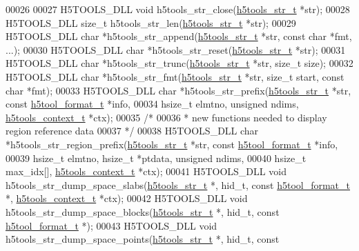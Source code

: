 \begin{DoxyCode}
00026 
00027 H5TOOLS\_DLL \textcolor{keywordtype}{void}     h5tools\_str\_close(\hyperlink{structh5tools__str__t}{h5tools\_str\_t} *str);
00028 H5TOOLS\_DLL \textcolor{keywordtype}{size\_t}   h5tools\_str\_len(\hyperlink{structh5tools__str__t}{h5tools\_str\_t} *str);
00029 H5TOOLS\_DLL \textcolor{keywordtype}{char}    *h5tools\_str\_append(\hyperlink{structh5tools__str__t}{h5tools\_str\_t} *str, \textcolor{keyword}{const} \textcolor{keywordtype}{char} *fmt, ...);
00030 H5TOOLS\_DLL \textcolor{keywordtype}{char}    *h5tools\_str\_reset(\hyperlink{structh5tools__str__t}{h5tools\_str\_t} *str);
00031 H5TOOLS\_DLL \textcolor{keywordtype}{char}    *h5tools\_str\_trunc(\hyperlink{structh5tools__str__t}{h5tools\_str\_t} *str, \textcolor{keywordtype}{size\_t} size);
00032 H5TOOLS\_DLL \textcolor{keywordtype}{char}    *h5tools\_str\_fmt(\hyperlink{structh5tools__str__t}{h5tools\_str\_t} *str, \textcolor{keywordtype}{size\_t} start, \textcolor{keyword}{const} \textcolor{keywordtype}{char} *fmt);
00033 H5TOOLS\_DLL \textcolor{keywordtype}{char}    *h5tools\_str\_prefix(\hyperlink{structh5tools__str__t}{h5tools\_str\_t} *str, \textcolor{keyword}{const} 
      \hyperlink{structh5tool__format__t}{h5tool\_format\_t} *info,
00034                         hsize\_t elmtno, \textcolor{keywordtype}{unsigned} ndims, \hyperlink{structh5tools__context__t}{h5tools\_context\_t} *ctx);
00035 \textcolor{comment}{/*}
00036 \textcolor{comment}{ * new functions needed to display region reference data}
00037 \textcolor{comment}{ */}
00038 H5TOOLS\_DLL \textcolor{keywordtype}{char}    *h5tools\_str\_region\_prefix(\hyperlink{structh5tools__str__t}{h5tools\_str\_t} *str, \textcolor{keyword}{const} 
      \hyperlink{structh5tool__format__t}{h5tool\_format\_t} *info,
00039                                    hsize\_t elmtno, hsize\_t *ptdata, \textcolor{keywordtype}{unsigned} ndims, 
00040                                    hsize\_t max\_idx[], \hyperlink{structh5tools__context__t}{h5tools\_context\_t} *ctx);
00041 H5TOOLS\_DLL \textcolor{keywordtype}{void}     h5tools\_str\_dump\_space\_slabs(\hyperlink{structh5tools__str__t}{h5tools\_str\_t} *, hid\_t, \textcolor{keyword}{const} 
      \hyperlink{structh5tool__format__t}{h5tool\_format\_t} *, \hyperlink{structh5tools__context__t}{h5tools\_context\_t} *ctx);
00042 H5TOOLS\_DLL \textcolor{keywordtype}{void}     h5tools\_str\_dump\_space\_blocks(\hyperlink{structh5tools__str__t}{h5tools\_str\_t} *, hid\_t, \textcolor{keyword}{const} 
      \hyperlink{structh5tool__format__t}{h5tool\_format\_t} *);
00043 H5TOOLS\_DLL \textcolor{keywordtype}{void}     h5tools\_str\_dump\_space\_points(\hyperlink{structh5tools__str__t}{h5tools\_str\_t} *, hid\_t, \textcolor{keyword}{const} 

\end{DoxyCode}
